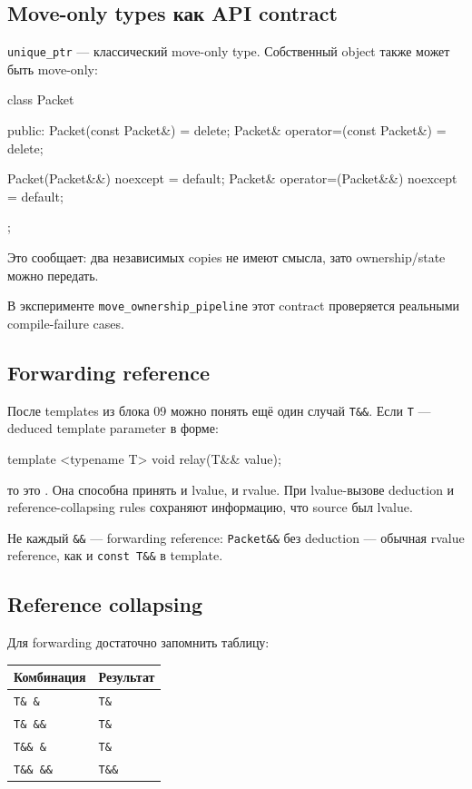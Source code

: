\subsection{Move-only types как API contract}

\texttt{unique\_ptr} --- классический move-only type. Собственный object также
может быть move-only:

\begin{cppcode}
class Packet {
public:
    Packet(const Packet&) = delete;
    Packet& operator=(const Packet&) = delete;

    Packet(Packet&&) noexcept = default;
    Packet& operator=(Packet&&) noexcept = default;
};
\end{cppcode}

Это сообщает: два независимых copies не имеют смысла, зато ownership/state
можно передать.

В эксперименте \texttt{move\_ownership\_pipeline} этот contract проверяется
реальными compile-failure cases.

\subsection{Forwarding reference}

После templates из блока 09 можно понять ещё один случай \texttt{T\&\&}.
Если \texttt{T} --- deduced template parameter в форме:

\begin{cppcode}
template <typename T>
void relay(T&& value);
\end{cppcode}

то это . Она способна принять и lvalue, и rvalue.
При lvalue-вызове deduction и reference-collapsing rules сохраняют информацию,
что source был lvalue.

Не каждый \texttt{\&\&} --- forwarding reference:
\texttt{Packet\&\&} без deduction --- обычная rvalue reference, как и
\texttt{const T\&\&} в template.

\subsection{Reference collapsing}

Для forwarding достаточно запомнить таблицу:

\begin{center}
\begin{tabular}{ll}
\toprule
Комбинация & Результат \\
\midrule
\texttt{T\& \&} & \texttt{T\&} \\
\texttt{T\& \&\&} & \texttt{T\&} \\
\texttt{T\&\& \&} & \texttt{T\&} \\
\texttt{T\&\& \&\&} & \texttt{T\&\&} \\
\bottomrule
\end{tabular}
\end{center}

